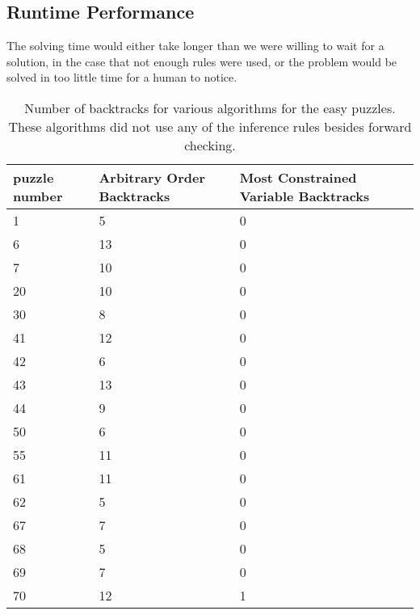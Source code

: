 \documentclass{article}
\begin{document}
 \subsection{Runtime Performance}
 The solving time would either take longer than we were willing to wait for a solution, in the case that not enough rules were used, or the problem would be solved in too little time for a human to notice. 
\begin{table}[h]\centering
  \begin{tabular}{lll}
    \toprule
    puzzle number& Arbitrary Order Backtracks & Most Constrained Variable Backtracks\\
    \midrule
    1& 5 & 0\\
    \midrule
    6& 13&0\\
    \midrule
    7& 10&0\\
    \midrule
    20&10&0\\
    \midrule
    30& 8&0\\
    \midrule
    41& 12& 0\\
    \midrule
    42& 6& 0\\
    \midrule
    43& 13&0\\
    \midrule
    44&9&0\\
    \midrule
    50&6&0\\
    \midrule
    55 &11 &0\\
    \midrule
    61& 11 &0\\
    \midrule
    62 &5&0\\
    \midrule
    67&7&0\\
    \midrule
    68& 5&0\\
    \midrule
    69&7&0\\
    \midrule
    70& 12 &1\\
    \bottomrule
  \end{tabular}
  \caption{Number of backtracks for various algorithms for the easy puzzles. These algorithms did not use any of the inference rules besides forward checking. }
  \label{tab:resultsEasy}
\end{table}
\end{document}
